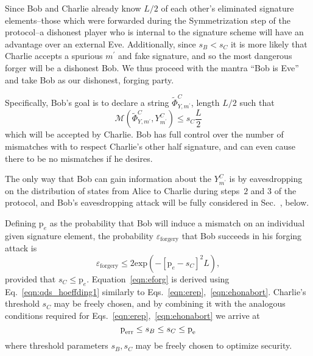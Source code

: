 
Since Bob and Charlie already know $L/2$ of each other's eliminated signature elements--those which were forwarded during the Symmetrization step of the protocol--a dishonest player who is internal to the signature scheme will have an advantage over an external Eve. Additionally, since $s_B < s_C$ it is more likely that Charlie accepts a spurious $m^\prime$ and fake signature, and so the most dangerous forger will be a dishonest Bob. We thus proceed with the mantra ``Bob is Eve'' and take Bob as our dishonest, forging party. 

Specifically, Bob's goal is to declare a string $\tilde{\Phi}^C_{Y, m^\prime}$, length $L/2$ such that 
\begin{equation}\label{eqn:forging_condition}
\mathcal{M}\left(\tilde{\Phi}^C_{Y, m^\prime}, Y_{m^\prime}^C\right) \le s_C \frac{L}{2}
\end{equation}
which will be accepted by Charlie. Bob has full control over the number of mismatches with to respect Charlie's other half signature, and can even cause there to be no mismatches if he desires.

The only way that Bob can gain information about the $Y_{m^\prime}^C$ is by eavesdropping on the distribution of states from Alice to Charlie during steps~$2$ and $3$ of the protocol, and Bob's eavesdropping attack will be fully considered in Sec.~, below.

Defining $\text{p}_e$ as the probability that Bob will induce a mismatch on an individual given signature element, the probability $\varepsilon_{\text{forgery}}$ that Bob succeeds in his forging attack is
\begin{equation}\label{eqn:eforg}
\varepsilon_{\text{forgery}} \le 2 \text{exp}\left( - \left[\text{p}_e - s_C\right]^2 L\right), 
\end{equation}
provided that $s_C \le \text{p}_e$. Equation~\ref{eqn:eforg} is derived using Eq.~\ref{eqn:qds_hoeffding1} similarly to Eqs.~\ref{eqn:erep},~\ref{eqn:ehonabort}. Charlie's threshold $s_C$ may be freely chosen, and by combining it with the analogous conditions required for Eqs.~\ref{eqn:erep},~\ref{eqn:ehonabort} we arrive at
\begin{equation}\label{eqn:qds_security_condition}
\text{p}_{\text{err}} \le s_B \le s_C \le \text{p}_{\text{e}} 
\end{equation}
where threshold parameters $s_B, s_C$ may be freely chosen to optimize security. 

